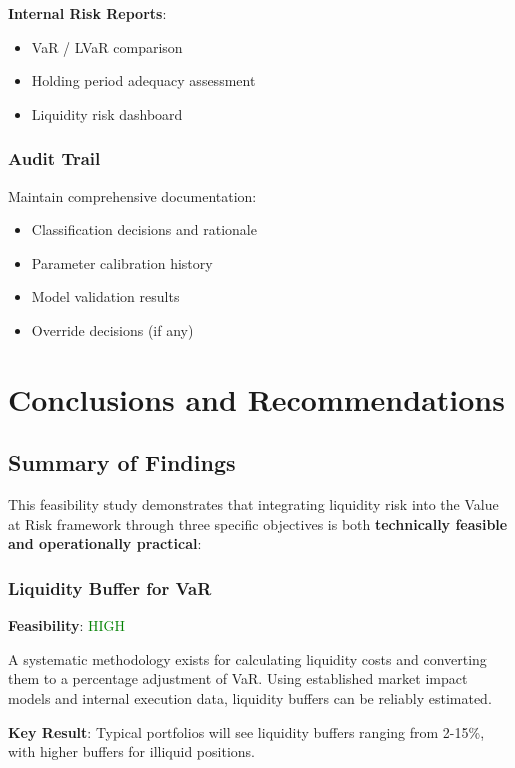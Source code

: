 \documentclass[11pt,a4paper]{article}
\begin{document}
\textbf{Internal Risk Reports}:
\begin{itemize}
    \item VaR / LVaR comparison
    \item Holding period adequacy assessment
    \item Liquidity risk dashboard
\end{itemize}

\subsubsection{Audit Trail}

Maintain comprehensive documentation:
\begin{itemize}
    \item Classification decisions and rationale
    \item Parameter calibration history
    \item Model validation results
    \item Override decisions (if any)
\end{itemize}

\section{Conclusions and Recommendations}

\subsection{Summary of Findings}

This feasibility study demonstrates that integrating liquidity risk into the Value at Risk framework through three specific objectives is both \textbf{technically feasible and operationally practical}:

\subsubsection{Liquidity Buffer for VaR}

\textbf{Feasibility}: \textcolor{green}{HIGH}

A systematic methodology exists for calculating liquidity costs and converting them to a percentage adjustment of VaR. Using established market impact models and internal execution data, liquidity buffers can be reliably estimated.

\textbf{Key Result}: Typical portfolios will see liquidity buffers ranging from 2-15\%, with higher buffers for illiquid positions.
\end{document}
